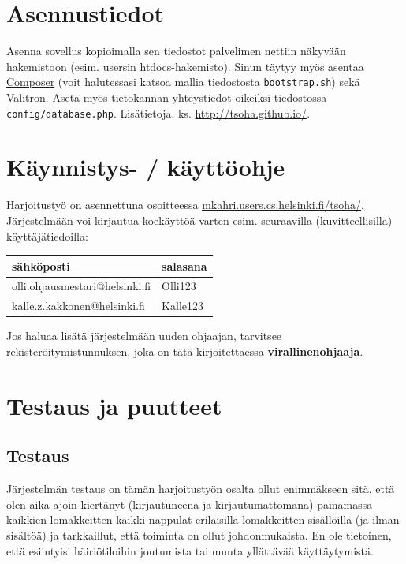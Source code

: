\documentclass[11pt,a4paper,finnish,oneside]{article}
\begin{document}
\section{Asennustiedot}
\begin{par}
Asenna sovellus kopioimalla sen tiedostot palvelimen nettiin näkyvään hakemistoon (esim. usersin htdocs-hakemisto). Sinun täytyy myös asentaa \href{https://getcomposer.org/}{Composer} (voit halutessasi katsoa mallia tiedostosta \verb|bootstrap.sh|) sekä \href{https://github.com/vlucas/valitron}{Valitron}. Aseta myös tietokannan yhteystiedot oikeiksi tiedostossa \verb|config/database.php|.  Lisätietoja, ks. \href{http://tsoha.github.io/}{http://tsoha.github.io/}.
\end{par}




\section{Käynnistys- / käyttöohje}
\begin{par}
Harjoitustyö on asennettuna osoitteessa \href{http://mkahri.users.cs.helsinki.fi/tsoha/}{mkahri.users.cs.helsinki.fi/tsoha/}. Järjestelmään voi kirjautua koekäyttöä varten esim. seuraavilla (kuvitteellisilla) käyttäjätiedoilla:

\vspace{2em}

    \begin{tabular}
    { | p{8cm} | p{4cm} |}
    \hline
    sähköposti & salasana\\ \hline
    olli.ohjausmestari@helsinki.fi & Olli123 \\ \hline
    kalle.z.kakkonen@helsinki.fi & Kalle123 \\ \hline
    \end{tabular}

\vspace{2em}

Jos haluaa lisätä järjestelmään uuden ohjaajan, tarvitsee rekisteröitymistunnuksen, joka on tätä kirjoitettaessa \textbf{virallinenohjaaja}. 

\end{par}

\section{Testaus ja puutteet}
\subsection{Testaus}
\begin{par}
Järjestelmän testaus on tämän harjoitustyön osalta ollut enimmäkseen sitä, että olen aika-ajoin kiertänyt (kirjautuneena ja kirjautumattomana) painamassa kaikkien lomakkeitten kaikki nappulat erilaisilla lomakkeitten sisällöillä (ja ilman sisältöä) ja tarkkaillut, että toiminta on ollut johdonmukaista. En ole tietoinen, että esiintyisi häiriötiloihin joutumista tai muuta yllättävää käyttäytymistä.
\end{par}
\end{document}
